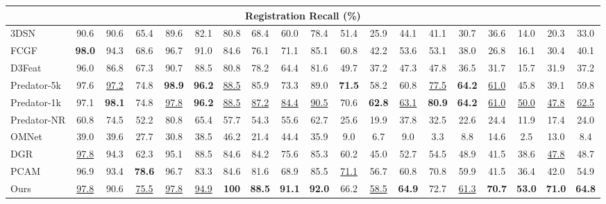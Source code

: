 \documentclass[10pt,twocolumn,letterpaper]{article}
\begin{document}
\begin{table*}[ht]
\begin{tabularx}{\linewidth}{X c c c c c c c c c | c c c c c c c c c}
  \hline
  \multicolumn{19}{c}{Registration Recall (\%) } \\
  \hline
  3DSN \cite{gojcic2019perfect}
  & 90.6 & 90.6 & 65.4 & 89.6 & 82.1 & 80.8 & 68.4 & 60.0 & 78.4
  & 51.4 & 25.9 & 44.1 & 41.1 & 30.7 & 36.6 & 14.0 & 20.3 & 33.0
  \\
  FCGF \cite{choy2019fcgf}
  & \textbf{98.0} & 94.3 & 68.6 & 96.7 & 91.0 & 84.6 & 76.1 & 71.1 & 85.1
  & 60.8 & 42.2 & 53.6 & 53.1 & 38.0 & 26.8 & 16.1 & 30.4 & 40.1
  \\
  D3Feat \cite{bai2020d3feat} 
  & 96.0 & 86.8 & 67.3 & 90.7 & 88.5 & 80.8 & 78.2 & 64.4 & 81.6
  & 49.7 & 37.2 & 47.3 & 47.8 & 36.5 & 31.7 & 15.7 & 31.9 & 37.2
  \\
  Predator-5k \cite{huang2021predator}
  & 97.6 & \underline{97.2} & 74.8 & \textbf{98.9} & \textbf{96.2} & \underline{88.5} & 85.9 & 73.3 & 89.0
  & \textbf{71.5} & 58.2 & 60.8 & \underline{77.5} & \textbf{64.2} & \underline{61.0} & 45.8 & 39.1 & 59.8
  \\
  Predator-1k \cite{huang2021predator} 
  & 97.1 & \textbf{98.1} & 74.8 & \underline{97.8} & \textbf{96.2} & \underline{88.5} & \underline{87.2} & \underline{84.4} & \underline{90.5}
  & 70.6 & \textbf{62.8} & \underline{63.1} & \textbf{80.9} & \textbf{64.2} & \underline{61.0} & \underline{50.0} & \underline{47.8} & \underline{62.5}
  \\
  Predator-NR \cite{huang2021predator} 
  & 60.8 & 74.5 & 52.2 & 80.8 & 65.4 & 57.7 & 54.3 & 55.6 & 62.7
  & 25.6 & 19.9 & 37.8 & 32.5 & 22.6 & 24.4 & 11.9 & 17.4 & 24.0
  \\
  OMNet \cite{xu2021omnet} 
  & 39.0 & 39.6 & 27.7 & 30.8 & 38.5 & 46.2 & 21.4 & 44.4 & 35.9
  & 9.0 & 6.7 & 9.0 & 3.3 & 8.8 & 14.6 & 2.5 & 13.0 & 8.4
  \\
  DGR \cite{choy2020dgr}
  & \underline{97.8} & 94.3 & 62.3 & 95.1 & 88.5 & 84.6 & 84.2 & 75.6 & 85.3
  & 60.2 & 45.0 & 52.7 & 54.5 & 48.9 & 41.5 & 38.6 & \underline{47.8} & 48.7
  \\
  PCAM \cite{cao2021pcam}
  & 96.9 & 93.4 & \textbf{78.6} & 96.7 & 83.3 & 84.6 & 81.6 & 68.9 & 85.5
  & \underline{71.1} & 56.7 & 60.8 & 70.8 & 59.9 & 41.5 & 36.4 & 42.0 & 54.9
  \\
  Ours
  & \underline{97.8} & 90.6 & \underline{75.5} & \underline{97.8} & \underline{94.9} & \textbf{100} & \textbf{88.5} & \textbf{91.1} & \textbf{92.0}
  & 66.2 & \underline{58.5} & \textbf{64.9} & 72.7 & \underline{61.3} & \textbf{70.7} & \textbf{53.0} & \textbf{71.0} & \textbf{64.8}
  \\

\end{tabularx}
\end{table*}
\end{document}
